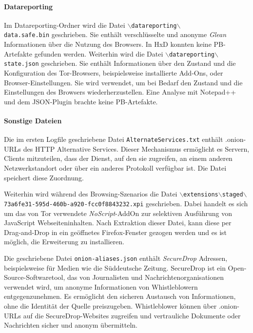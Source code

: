 \begin{appendices}
\paragraph*{Datareporting}
Im \glqq{}Datareporting\grqq{}-Ordner wird die Datei \texttt{$\backslash$datareporting$\backslash$\\data.safe.bin} geschrieben. Sie enthält verschlüsselte und anonyme \textit{Glean} Informationen über die Nutzung des Browsers. \cite{GitHub.05.06.2023b}
In HxD konnten keine PB-Artefakte gefunden werden.
Weiterhin wird die Datei \texttt{$\backslash$datareporting$\backslash$state.json} geschrieben.
Sie enthält Informationen über den Zustand und die Konfiguration des Tor-Browsers, beispielsweise installierte Add-Ons, oder Browser-Einstellungen. Sie wird verwendet, um bei Bedarf den Zustand und die Einstellungen des Browsers wiederherzustellen. \cite{GitHub.08.04.2019}
Eine Analyse mit Notepad++ und dem JSON-Plugin brachte keine PB-Artefakte.

\paragraph*{Sonstige Dateien}
Die im ersten Logfile geschriebene Datei \texttt{AlternateServices.txt}
enthält .onion-URLs des HTTP Alternative Services. Dieser Mechanismus ermöglicht es Servern, Clients mitzuteilen, dass der Dienst, auf den sie zugreifen, an einem anderen Netzwerkstandort oder über ein anderes Protokoll verfügbar ist. Die Datei speichert diese Zuordnung. \cite{MozillaSupport.26.10.2020}

Weiterhin wird während des Browsing-Szenarios die Datei \texttt{$\backslash$extensions$\backslash$staged$\backslash${73a6fe31-595d-460b-a920-fcc0f8843232}.xpi} geschrieben. Dabei handelt es sich um das von Tor verwendete \textit{NoScript}-AddOn zur selektiven Ausführung von JavaScript Webseiteninhalten.
Nach Extraktion dieser Datei, kann diese per Drag-and-Drop in ein geöffnetes Firefox-Fenster gezogen werden und es ist möglich, die Erweiterung zu installieren.

Die geschriebene Datei \texttt{onion-aliases.json} enthält \textit{SecureDrop} Adressen, beispielsweise für Medien wie die Süddeutsche Zeitung. 
SecureDrop ist ein Open-Source-Softwaretool, das von Journalisten und Nachrichtenorganisationen verwendet wird, um anonyme Informationen von Whistleblowern entgegenzunehmen. Es ermöglicht den sicheren Austausch von Informationen, ohne die Identität der Quelle preiszugeben. Whistleblower können über .onion-URLs auf die SecureDrop-Websites zugreifen und vertrauliche Dokumente oder Nachrichten sicher und anonym übermitteln. \cite{SecureDrop.05.06.2023}


\end{appendices}
